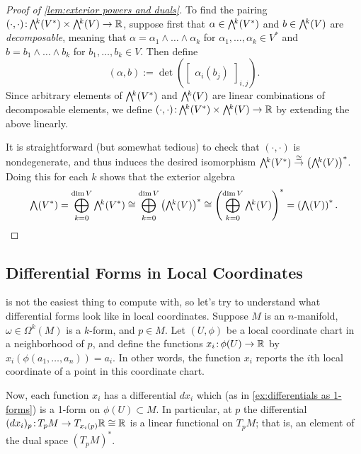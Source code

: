 \begin{proof}[Proof of \cref{lem:exterior powers and duals}]
	To find the pairing $(\cdot , \cdot ) \from \ext{k}(V^\ast) \times \ext{k} (V) \to \R$, suppose first that $\alpha \in \ext{k}(V^\ast)$ and $b \in \ext{k}(V)$ are \emph{decomposable}, meaning that $\alpha = \alpha_1 \wedge \dots \wedge \alpha_k$ for $\alpha_1 , \dots , \alpha_k \in V^\ast$ and $b = b_1 \wedge \dots \wedge b_k$ for $b_1, \dots , b_k \in V$. Then define
	\[
		(\alpha, b) := \det \left( \begin{bmatrix} \alpha_i(b_j) \end{bmatrix}_{i,j}\right).
	\]
	Since arbitrary elements of $\ext{k}(V^\ast)$ and $\ext{k}(V)$ are linear combinations of decomposable elements, we define $(\cdot , \cdot ) \from \ext{k}(V^\ast) \times \ext{k} (V) \to \R$ by extending the above linearly. 
	
	It is straightforward (but somewhat tedious) to check that $(\cdot , \cdot)$ is nondegenerate, and thus induces the desired isomorphism $\ext{k}(V^\ast) \overset{\cong}{\to} \left(\ext{k}(V)\right)^\ast$. Doing this for each $k$ shows that the exterior algebra
	\[
		\ext{}(V^\ast) = \bigoplus_{k=0}^{\dim V} \ext{k}(V^\ast) \cong \bigoplus_{k=0}^{\dim V} \left(\ext{k}(V)\right)^\ast \cong \left( \bigoplus_{k=0}^{\dim V} \ext{k}(V)\right)^\ast = \left(\ext{}(V)\right)^\ast.
	\]
\end{proof}

\subsection{Differential Forms in Local Coordinates}
\label{sub:differential_forms_in_local_coordinates}

 is not the easiest thing to compute with, so let's try to understand what differential forms look like in local coordinates. Suppose $M$ is an $n$-manifold, $\omega \in \Omega^k(M)$ is a $k$-form, and $p \in M$. Let $(U,\phi)$ be a local coordinate chart in a neighborhood of $p$, and define the functions $x_i \colon\thinspace\!\! \phi(U) \to \mathbb{R}$ by $x_i(\phi(a_1, \dots , a_n)) = a_i$. In other words, the function $x_i$ reports the $i$th local coordinate of a point in this coordinate chart.

Now, each function $x_i$ has a differential $dx_i$ which (as in \cref{ex:differentials as 1-forms}) is a 1-form on $\phi(U) \subset M$. In particular, at $p$ the differential $(dx_i)_p \colon\thinspace\!\! T_p M \to T_{x_i(p)}\mathbb{R} \cong \mathbb{R}$ is a linear functional on $T_pM$; that is, an element of the dual space $\left(T_pM\right)^\ast$.

